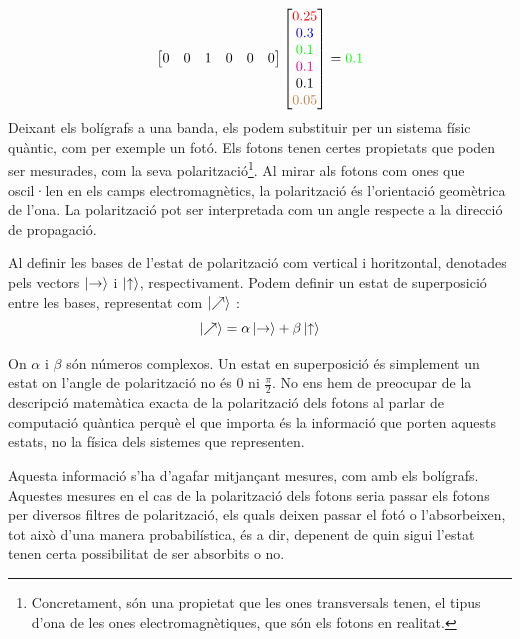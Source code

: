 $$
\begin{bmatrix}
	0 & 0 & 1 & 0 & 0 & 0\\
\end{bmatrix}
\begin{bmatrix}
	\textcolor{red}{0.25} \\
	\textcolor{blue}{0.3 }\\
	\textcolor{green}{0.1 }\\
	\textcolor{magenta}{0.1 }\\
	\textcolor{black}{0.1 }\\
	\textcolor{brown}{0.05}
\end{bmatrix} = \textcolor{green}{0.1 }
$$
Deixant els bolígrafs a una banda, els podem substituir per un sistema físic quàntic, com per exemple un fotó. Els fotons tenen certes propietats que poden ser mesurades, com la seva polarització\footnote{Concretament, són una propietat que les ones transversals tenen, el tipus d'ona de les ones electromagnètiques, que són els fotons en realitat.}. Al mirar als fotons com ones que oscil·len en els camps electromagnètics, la polarització és l'orientació geomètrica de l'ona. La polarització pot ser interpretada com un angle respecte a la direcció de propagació.

Al definir les bases de l'estat de polarització com vertical i horitzontal, denotades pels vectors $\ket{\text{\textrightarrow}}$ i $\ket{\text{\textuparrow}}$, respectivament. Podem definir un estat de superposició entre les bases, representat com $\ket{\nearrow}$ \cite{QC_intro:photon}:
\begin{equation}
	\ket{\nearrow} = \alpha\ket{\text{\textrightarrow}} + \beta\ket{\text{\textuparrow}}
	\label{eq:photon_state}
\end{equation}

On $\alpha$ i $\beta$ són números complexos. 
Un estat en superposició és simplement un estat on l'angle de polarització no és $0$ ni $\frac{\pi}{2}$. No ens hem de preocupar de la descripció matemàtica exacta de la polarització dels fotons al parlar de computació quàntica perquè el que importa és la informació que porten aquests estats, no la física dels sistemes que representen.

Aquesta informació s'ha d'agafar mitjançant mesures, com amb els bolígrafs. Aquestes mesures en el cas de la polarització dels fotons seria passar els fotons per diversos filtres de polarització, els quals deixen passar el fotó o l'absorbeixen, tot això d'una manera probabilística, és a dir, depenent de quin sigui l'estat tenen certa possibilitat de ser absorbits o no.

